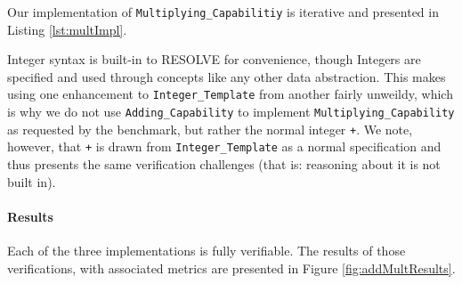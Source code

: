 

Our implementation of \texttt{Multiplying\_Capabilitiy} is iterative and presented in Listing \ref{lst:multImpl}.



\begin{sloppypar}
Integer syntax is built-in to RESOLVE for convenience, though Integers are specified and used through concepts like any other data abstraction. This makes using one enhancement to \texttt{Integer\_Template} from another fairly unweildy, which is why we do not use \texttt{Adding\_Capability} to implement \texttt{Multiplying\_Capability} as requested by the benchmark, but rather the normal integer \texttt{+}. We note, however, that \texttt{+} is drawn from \texttt{Integer\_Template} as a normal specification and thus presents the same verification challenges (that is: reasoning about it is not built in).
\end{sloppypar}

\paragraph{Results}Each of the three implementations is fully verifiable.  The results of those verifications, with associated metrics are presented in Figure \ref{fig:addMultResults}.

